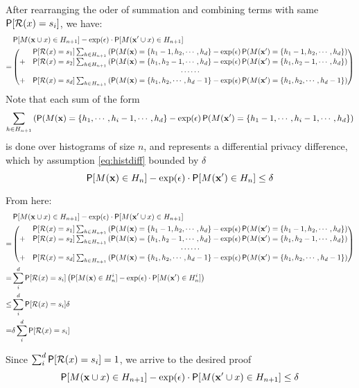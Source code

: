 \documentclass[11pt]{article}
\newcommand{\cR}{\mathcal{R}}
\newcommand{\xv}{\mathbf{x}}
\begin{document}
\begin{prop}
After rearranging the oder of summation and combining terms with same $ \P[\cR(x) = s_i]$, we have:
 \begin{align*}
& \P[M(\xv \cup x) \in H_{n+1}] - \exp(\epsilon) \cdot \P[M(\xv' \cup x) \in H_{n+1}]  \\
= & \begin{pmatrix} 
& \P[\cR(x) = s_1] \sum_{h \in H_{n+1}}  \left (   \P(M(\xv) = \{h_1 -1 , h_2, \cdots, h_d \}  -  \exp(\epsilon)\P(M(\xv') = \{h_1 - 1, h_2,  \cdots, h_d \}   \right) \\
+ & \P[\cR(x) = s_2] \sum_{h \in H_{n+1}}  \left (   \P(M(\xv) = \{h_1, h_2 - 1, \cdots, h_d \}  -  \exp(\epsilon)\P(M(\xv') = \{h_1,  h_2 - 1, \cdots, h_d \}   \right) \\
& \cdots \cdots \\
+  & \P[\cR(x) = s_d] \sum_{h \in H_{n+1}}  \left (   \P(M(\xv) = \{h_1, h_2, \cdots, h_d -1 \}  -  \exp(\epsilon)\P(M(\xv') = \{h_1, h_2,  \cdots, h_d -1 \}   \right) 
\end{pmatrix}
 \end{align*}
Note that each sum of the form  
\[ \sum_{h \in H_{n+1}}  \left (   \P(M(\xv) = \{h_1, \cdots, h_i-1, \cdots, h_d \}  -  \exp(\epsilon)\P(M(\xv') = \{h_1 - 1,  \cdots, h_i-1, \cdots, h_d \}   \right) \]
is done over histograms of size $n$, and represents a differential privacy difference, which by assumption  \eqref{eq:histdiff} bounded by $\delta$
\[ \P[M(\xv) \in H_n] - \exp(\epsilon) \cdot \P[M(\xv') \in H_n] \le \delta \]

From here:
 \begin{align*}
& \P[M(\xv \cup x) \in H_{n+1}] - \exp(\epsilon) \cdot \P[M(\xv' \cup x) \in H_{n+1}]  \\
= & \begin{pmatrix} 
& \P[\cR(x) = s_1] \sum_{h \in H_{n+1}}  \left (   \P(M(\xv) = \{h_1 -1 , h_2, \cdots, h_d \}  -  \exp(\epsilon)\P(M(\xv') = \{h_1 - 1, h_2,  \cdots, h_d \}   \right) \\
+ & \P[\cR(x) = s_2] \sum_{h \in H_{n+1}}  \left (   \P(M(\xv) = \{h_1, h_2 - 1, \cdots, h_d \}  -  \exp(\epsilon)\P(M(\xv') = \{h_1,  h_2 - 1, \cdots, h_d \}   \right) \\
& \cdots \cdots \\
+  & \P[\cR(x) = s_d] \sum_{h \in H_{n+1}}  \left (   \P(M(\xv) = \{h_1, h_2, \cdots, h_d -1 \}  -  \exp(\epsilon)\P(M(\xv') = \{h_1, h_2,  \cdots, h_d -1 \}   \right) 
\end{pmatrix} \\
= & \sum^d_i  \P[\cR(x) = s_i] \left (   \P[M(\xv) \in H^i_n] - \exp(\epsilon) \cdot \P[M(\xv') \in H^i_n] \right ) \\
\le &  \sum^d_i  \P[\cR(x) = s_i]  \delta \\
= & \delta \sum^d_i  \P[\cR(x) = s_i]  
 \end{align*}
 
 Since $ \sum^d_i  \P[\cR(x) = s_i] =1$, we arrive to the desired proof
 \[  \P[M(\xv \cup x) \in H_{n+1}] - \exp(\epsilon) \cdot \P[M(\xv' \cup x) \in H_{n+1}]   \le \delta \]

\end{prop}
\end{document}
